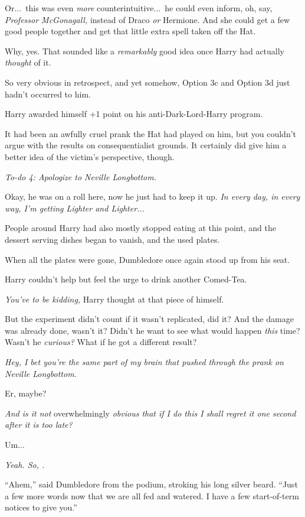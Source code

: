 Or...\ this was even \emph{more} counterintuitive...\ he could even inform, oh, say, \emph{Professor McGonagall,} instead of Draco \emph{or} Hermione. And she could get a few good people together and get that little extra spell taken off the Hat.

Why, yes. That sounded like a \emph{remarkably} good idea once Harry had actually \emph{thought} of it.

So very obvious in retrospect, and yet somehow, Option 3c and Option 3d just hadn’t occurred to him.

Harry awarded himself +1 point on his anti-Dark-Lord-Harry program.

It had been an awfully cruel prank the Hat had played on him, but you couldn’t argue with the results on consequentialist grounds. It certainly did give him a better idea of the victim’s perspective, though.

\emph{To-do 4: Apologize to Neville Longbottom.}

Okay, he was on a roll here, now he just had to keep it up. \emph{In every day, in every way, I’m getting Lighter and Lighter...}

People around Harry had also mostly stopped eating at this point, and the dessert serving dishes began to vanish, and the used plates.

When all the plates were gone, Dumbledore once again stood up from his seat.

Harry couldn’t help but feel the urge to drink another Comed-Tea.

\emph{You’ve  to be kidding,} Harry thought at that piece of himself.

But the experiment didn’t count if it wasn’t replicated, did it? And the damage was already done, wasn’t it? Didn’t he want to see what would happen \emph{this} time? Wasn’t he \emph{curious?} What if he got a different result?

\emph{Hey, I bet you’re the same part of my brain that pushed through the prank on Neville Longbottom.}

Er, maybe?

\emph{And is it not} overwhelmingly \emph{obvious that if I do this I shall regret it one second after it is too late?}

Um...

\emph{Yeah. So, .}

“Ahem,” said Dumbledore from the podium, stroking his long silver beard. “Just a few more words now that we are all fed and watered. I have a few start-of-term notices to give you.”

